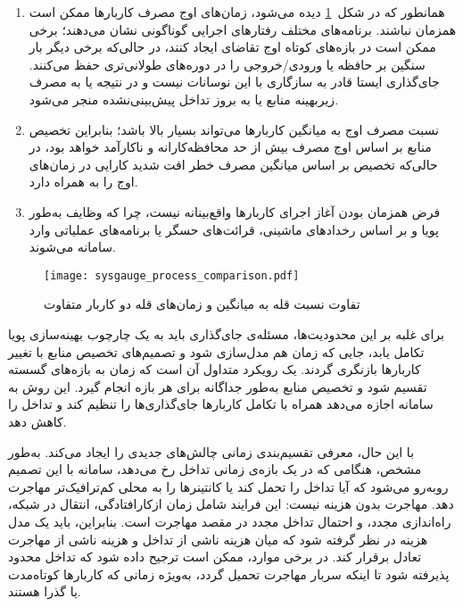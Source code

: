 \begin{enumerate}
\item
همانطور که در شکل~\ref{figure:CPU_Comp} دیده می‌شود، زمان‌های اوج مصرف کاربارها ممکن است همزمان نباشند. برنامه‌های مختلف رفتارهای اجرایی گوناگونی نشان می‌دهند؛ برخی ممکن است در بازه‌های کوتاه اوج تقاضای  ایجاد کنند، در حالی‌که برخی دیگر بار سنگین بر حافظه یا ورودی/خروجی را در دوره‌های طولانی‌تری حفظ می‌کنند. جای‌گذاری ایستا قادر به سازگاری با این نوسانات نیست و در نتیجه یا به مصرف زیربهینه منابع یا به بروز تداخل پیش‌بینی‌نشده منجر می‌شود. 

\item
نسبت مصرف اوج به میانگین کاربارها می‌تواند بسیار بالا باشد؛ بنابراین تخصیص منابع بر اساس اوج مصرف بیش از حد محافظه‌کارانه و ناکارآمد خواهد بود، در حالی‌که تخصیص بر اساس میانگین مصرف خطر افت شدید کارایی در زمان‌های اوج را به همراه دارد. 

\item
فرض همزمان بودن آغاز اجرای کاربارها واقع‌بینانه نیست، چرا که وظایف به‌طور پویا و بر اساس رخدادهای ماشینی، قرائت‌های حسگر یا برنامه‌های عملیاتی وارد سامانه می‌شوند.
\end{enumerate}

\vspace{0.5cm}
\begin{figure}[h]
\centering
\texttt{[image: sysgauge\_process\_comparison.pdf]}
\caption{تفاوت نسبت قله به میانگین و زمان‌های قله دو کاربار متفاوت}
\label{figure:CPU_Comp}
\end{figure}
\vspace{0.5cm}

برای غلبه بر این محدودیت‌ها، مسئله‌ی جای‌گذاری باید به یک چارچوب بهینه‌سازی پویا تکامل یابد، جایی که زمان هم مدل‌سازی شود و تصمیم‌های تخصیص منابع با تغییر کاربارها بازنگری گردند. یک رویکرد متداول آن است که زمان به بازه‌های گسسته تقسیم شود\cite{buchaca2020seq2seq} و تخصیص منابع به‌طور جداگانه برای هر بازه انجام گیرد\cite{Masouros2021Rusty}. این روش به سامانه اجازه می‌دهد همراه با تکامل کاربارها جای‌گذاری‌ها را تنظیم کند و تداخل را کاهش دهد.

با این حال، معرفی تقسیم‌بندی زمانی چالش‌های جدیدی را ایجاد می‌کند. به‌طور مشخص، هنگامی که در یک بازه‌ی زمانی تداخل رخ می‌دهد، سامانه با این تصمیم روبه‌رو می‌شود که آیا تداخل را تحمل کند یا کانتینرها را به محلی کم‌ترافیک‌تر مهاجرت دهد. مهاجرت بدون هزینه نیست: این فرایند شامل زمان ازکارافتادگی، انتقال در شبکه، راه‌اندازی مجدد، و احتمال تداخل مجدد در مقصد مهاجرت است\cite{Javadi2017DIAL}. بنابراین، باید یک مدل هزینه در نظر گرفته شود که میان هزینه ناشی از تداخل و هزینه ناشی از مهاجرت تعادل برقرار کند. در برخی موارد، ممکن است ترجیح داده شود که تداخل محدود پذیرفته شود تا اینکه سربار مهاجرت تحمیل گردد، به‌ویژه زمانی که کاربارها کوتاه‌مدت یا گذرا هستند\cite{Anu2019IALM}.

